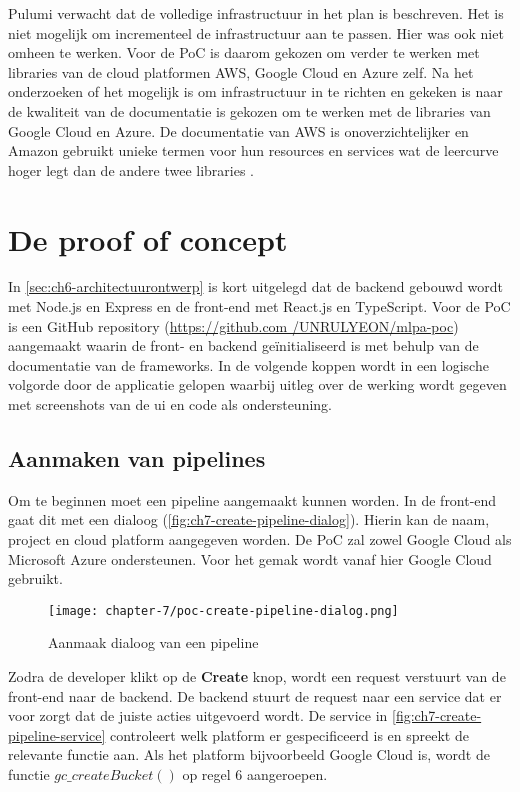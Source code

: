 Pulumi verwacht dat de volledige infrastructuur in het plan is beschreven. Het is niet mogelijk om incrementeel de infrastructuur aan te passen. Hier was ook niet omheen te werken. Voor de PoC is daarom gekozen om verder te werken met libraries van de cloud platformen AWS, Google Cloud en Azure zelf. Na het onderzoeken of het mogelijk is om infrastructuur in te richten en gekeken is naar de kwaliteit van de documentatie is gekozen om te werken met de libraries van Google Cloud en Azure. De documentatie van AWS is onoverzichtelijker en Amazon gebruikt unieke termen voor hun resources en services wat de leercurve hoger legt dan de andere twee libraries \cite{aws-sdk-javascript-docs}.

\section{De proof of concept}\label{sec:ch7-de-proof-of-concept}
In \autoref{sec:ch6-architectuurontwerp} is kort uitgelegd dat de backend gebouwd wordt met Node.js en Express en de front-end met React.js en TypeScript. Voor de PoC is een GitHub repository (\hyperlink{https://github.com/UNRULYEON/mlpa-poc}{https://github.com /UNRULYEON/mlpa-poc}) aangemaakt waarin de front- en backend geïnitialiseerd is met behulp van de documentatie van de frameworks. In de volgende koppen wordt in een logische volgorde door de applicatie gelopen waarbij uitleg over de werking wordt gegeven met screenshots van de \acrshort{ui} en code als ondersteuning.

\subsection{Aanmaken van pipelines}\label{subsec:ch7-aanmaken-van-pipelines}
Om te beginnen moet een pipeline aangemaakt kunnen worden. In de front-end gaat dit met een dialoog (\autoref{fig:ch7-create-pipeline-dialog}). Hierin kan de naam, project en cloud platform aangegeven worden. De PoC zal zowel Google Cloud als Microsoft Azure ondersteunen. Voor het gemak wordt vanaf hier Google Cloud gebruikt. 

\begin{figure}[hbt!]
  \centering
  \texttt{[image: chapter-7/poc-create-pipeline-dialog.png]}
  \caption{Aanmaak dialoog van een pipeline}
  \label{fig:ch7-create-pipeline-dialog}
\end{figure}

Zodra de developer klikt op de \textbf{Create} knop, wordt een request verstuurt van de front-end naar de backend. De backend stuurt de request naar een service dat er voor zorgt dat de juiste acties uitgevoerd wordt. De service in \autoref{fig:ch7-create-pipeline-service} controleert welk platform er gespecificeerd is en spreekt de relevante functie aan. Als het platform bijvoorbeeld Google Cloud is, wordt de functie \(gc\_createBucket()\) op regel 6 aangeroepen.

